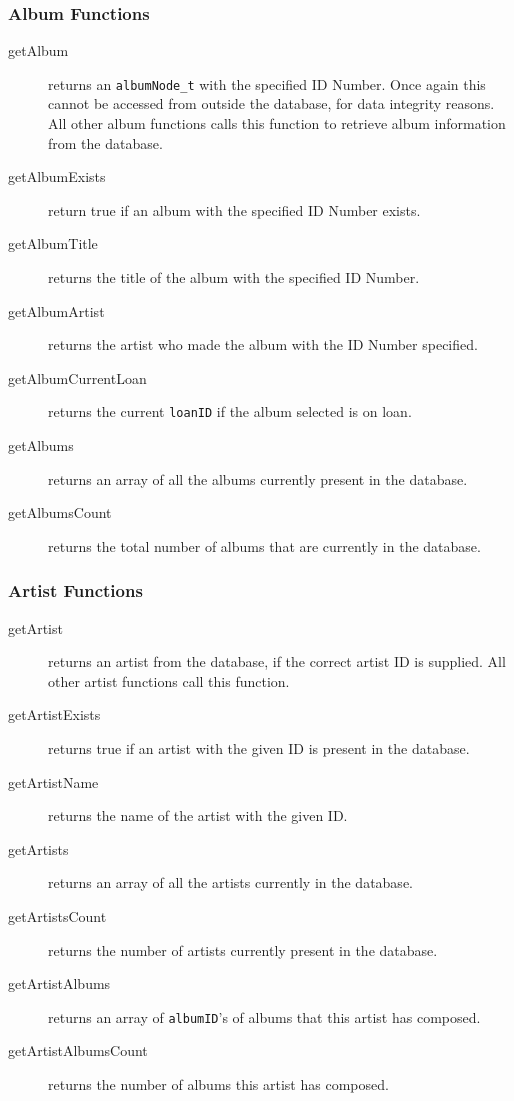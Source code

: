 \documentclass{article}
\begin{document}
\subsubsection{Album Functions}
\begin{description}
\item[getAlbum] returns an \verb|albumNode_t| with the specified ID Number. Once again this cannot be accessed from outside the database, for data integrity reasons. All other album functions calls this function to retrieve album information from the database.
\item[getAlbumExists] return true if an album with the specified ID Number exists.
\item[getAlbumTitle] returns the title of the album with the specified ID Number.
\item[getAlbumArtist] returns the artist who made the album with the ID Number specified.
\item[getAlbumCurrentLoan] returns the current \verb|loanID| if the album selected is on loan.
\item[getAlbums] returns an array of all the albums currently present in the database.
\item[getAlbumsCount] returns the total number of albums that are currently in the database.
\end{description}

\subsubsection{Artist Functions}
\begin{description}
\item[getArtist] returns an artist from the database, if the correct artist ID is supplied. All other artist functions call this function.
\item[getArtistExists] returns true if an artist with the given ID is present in the database.
\item[getArtistName] returns the name of the artist with the given ID.
\item[getArtists] returns an array of all the artists currently in the database.
\item[getArtistsCount] returns the number of artists currently present in the database.
\item[getArtistAlbums] returns an array of \verb|albumID|'s of albums that this artist has composed.
\item[getArtistAlbumsCount] returns the number of albums this artist has composed.
\end{description}
\end{document}
